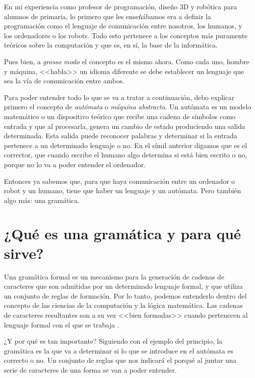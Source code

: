 
En mi experiencia como profesor de programación, diseño 3D y robótica para alumnos de primaria, lo primero que les enseñábamos era a definir la programación como el lenguaje de comunicación entre nosotros, los humanos, y los ordenadores o los robots. Todo esto pertenece a los conceptos más puramente teóricos sobre la computación y que es, en sí, la base de la informática. 

Pues bien, a \emph{grosso modo} el concepto es el mismo ahora. Como cada uno, hombre y máquina, <<habla>> un idioma diferente se debe establecer un lenguaje que sea la vía de comunicación entre ambos. 

Para poder entender todo lo que se va a tratar a continuación, debo explicar primero el concepto de \textit{autómata} o \textit{máquina abstracta}. Un autómata es un modelo matemático o un dispositivo teórico que recibe una cadena de símbolos como entrada y que al procesarla, genera un cambio de estado produciendo una salida determinada. Esta salida puede reconocer palabras y determinar si la entrada pertenece a un determinado lenguaje o no. En el símil anterior digamos que es el corrector, que cuando escribe el humano algo determina si está bien escrito o no, porque no lo va a poder entender el ordenador. 

Entonces ya sabemos que, para que haya comunicación entre un ordenador o robot y un humano, tiene que haber un lenguaje y un autómata. Pero también algo más: una gramática.

\section{¿Qué es una gramática y para qué sirve?}

Una gramática formal es un mecanismo para la generación de cadenas de caracteres que son admitidas por un determinado lenguaje formal, y que utiliza un conjunto de reglas de formación. Por lo tanto, podemos entenderlo dentro del concepto de las ciencias de la computación y la lógica matemática. Las cadenas de caracteres resultantes son a su vez <<bien formadas>> cuando pertenecen al lenguaje formal con el que se trabaja \cite{aho1986compilers}.

¿Y por qué es tan importante? Siguiendo con el ejemplo del principio, la gramática es la que va a determinar si lo que se introduce en el autómata es correcto o no. Un conjunto de reglas que nos indicará el porqué al juntar una serie de caracteres de una forma se van a poder entender.


